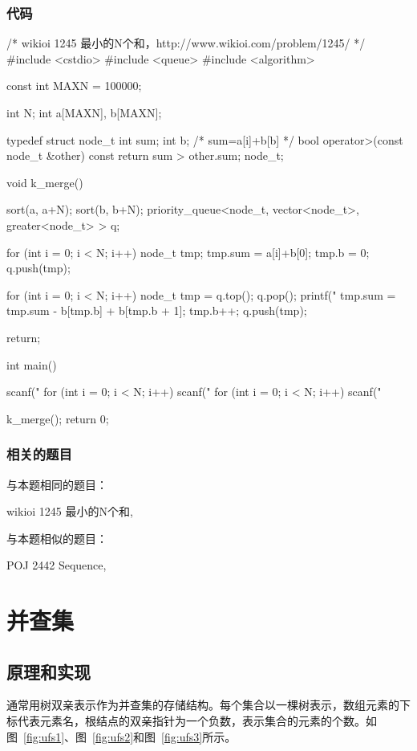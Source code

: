 \subsubsection{代码}
\begin{Codex}[label=sequence.cpp]
/* wikioi 1245 最小的N个和，http://www.wikioi.com/problem/1245/  */
#include <cstdio>
#include <queue>
#include <algorithm>

const int MAXN = 100000;

int N;
int a[MAXN], b[MAXN];

typedef struct node_t {
    int sum;
    int b; /* sum=a[i]+b[b] */
    bool operator>(const node_t &other) const {
        return sum > other.sum;
    }
} node_t;


void k_merge() {
    sort(a, a+N);
    sort(b, b+N);
    priority_queue<node_t, vector<node_t>,
                                greater<node_t> > q;

    for (int i = 0; i < N; i++) {
        node_t tmp;
        tmp.sum = a[i]+b[0];
        tmp.b = 0;
        q.push(tmp);
    }

    for (int i = 0; i < N; i++) {
        node_t tmp = q.top(); q.pop();
        printf("%
        tmp.sum = tmp.sum - b[tmp.b] + b[tmp.b + 1];
        tmp.b++;
        q.push(tmp);
    }

    return;
}

int main() {
    scanf("%
    for (int i = 0; i < N; i++) {
        scanf("%
    }
    for (int i = 0; i < N; i++) {
        scanf("%
    }

    k_merge();
    return 0;
}
\end{Codex}

\subsubsection{相关的题目}
与本题相同的题目：
\begindot
\item wikioi 1245 最小的N个和, 
\myenddot

与本题相似的题目：
\begindot
\item  POJ 2442 Sequence, 
\myenddot


\section{并查集} %

\subsection{原理和实现}
通常用树双亲表示作为并查集的存储结构。每个集合以一棵树表示，数组元素的下标代表元素名，根结点的双亲指针为一个负数，表示集合的元素的个数。如图~\ref{fig:ufs1}、图~\ref{fig:ufs2}和图~\ref{fig:ufs3}所示。


